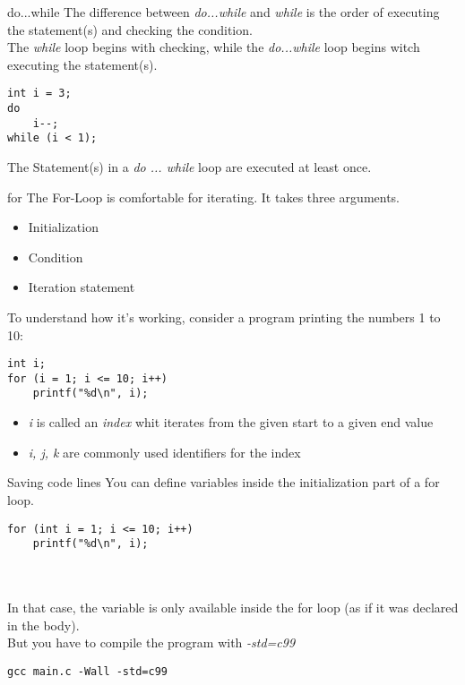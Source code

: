 \begin{frame}[fragile]{do...while}
	The difference between \textit{do...while} and \textit{while} is the order of executing the statement(s) and checking the condition.\\
	The \textit{while} loop begins with checking, while the \textit{do...while} loop begins witch executing the statement(s).
	\begin{lstlisting}[numbers=none]
int i = 3;
do
	i--;
while (i < 1);
\end{lstlisting}
	The Statement(s) in a \textit{do ... while} loop are executed at least once.
\end{frame}
\begin{frame}[fragile]{for}
	The For-Loop is comfortable for iterating. It takes three arguments.
	\begin{itemize}
		\item Initialization
		\item Condition
		\item Iteration statement
	\end{itemize}
	To understand how it's working, consider a program printing the numbers 1 to 10:
	\begin{lstlisting}[numbers=none]
int i;
for (i = 1; i <= 10; i++)
	printf("%d\n", i);
\end{lstlisting}
	\begin{itemize}
		\item \textit{i} is called an \textit{index} whit iterates from the given start to a given end value
		\item \textit{i, j, k} are commonly used identifiers for the index
	\end{itemize}
\end{frame}
\begin{frame}[fragile]{Saving code lines}
	You can define variables inside the initialization part of a for loop.
	\begin{lstlisting}[numbers=none]
for (int i = 1; i <= 10; i++)
	printf("%d\n", i);
\end{lstlisting}
	\ \\\ \\In that case, the variable is only available inside the for loop (as if it was declared in the body).\\
	But you have to compile the program with \textit{-std=c99}
	\begin{lstlisting}[numbers=none]
gcc main.c -Wall -std=c99
\end{lstlisting}
\end{frame}

